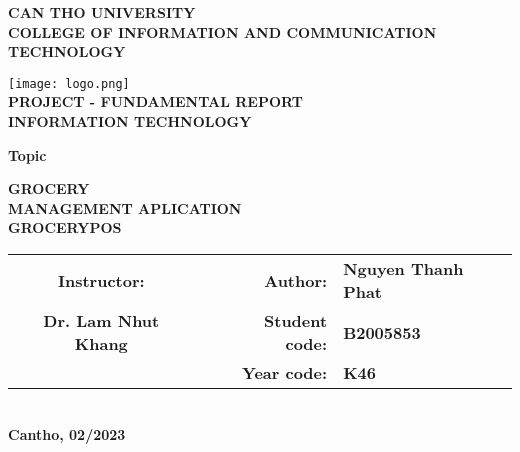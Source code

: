 \documentclass[../thesis.tex]{subfiles}
\begin{document}
\begin{titlepage}

\begin{center}

\textbf{CAN THO UNIVERSITY\\}
\textbf{COLLEGE OF INFORMATION AND COMMUNICATION TECHNOLOGY\\[1cm]}

\texttt{[image: logo.png]}\\[1cm]

\textbf{ PROJECT - FUNDAMENTAL REPORT\\}
\textbf{INFORMATION TECHNOLOGY\\[1.5cm]}


\begin{large}
\textbf{Topic\\[0.5cm]}
\end{large}
\textbf{{\LARGE GROCERY\\MANAGEMENT APLICATION\\[0.4cm]GROCERYPOS}}
\\[3.5cm]

\begin{tabular}{ c c r l }
 \textbf{Instructor:} & & \textbf{Author:} & \textbf{Nguyen Thanh Phat}\\ 
 \textbf{Dr. Lam Nhut Khang} & & \textbf{Student code:} & \textbf{B2005853}\\  
 & & \textbf{Year code:} & \textbf{K46}
\end{tabular}
\\[4cm]

\textbf{Cantho, 02/2023}

\end{center}

\end{titlepage}
\end{document}
